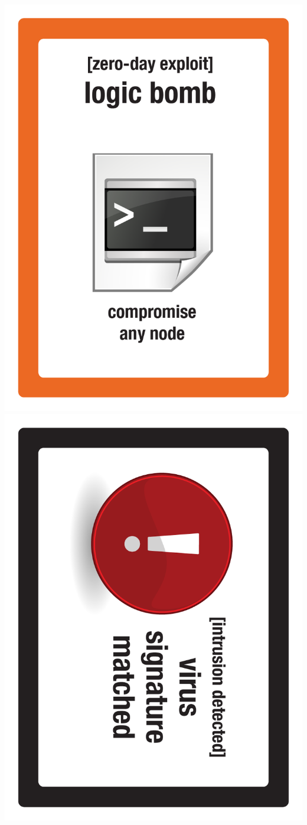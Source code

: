 \documentclass{letter}
\begin{document}
\includegraphics{lo0t/lo0t.exploit_logic_bomb}
\includegraphics{lo0t/lo0t.detection_virus_sig}
\end{document}
